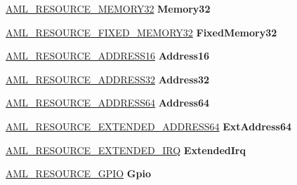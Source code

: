 \begin{DoxyCompactItemize}
\item 
\mbox{\label{unionaml__resource_a47e24e4893905f5f7604a7946262ae21}} 
\hyperlink{structaml__resource__memory32}{A\+M\+L\+\_\+\+R\+E\+S\+O\+U\+R\+C\+E\+\_\+\+M\+E\+M\+O\+R\+Y32} {\bfseries Memory32}
\item 
\mbox{\label{unionaml__resource_a48fd389a6eec34ed3a9aa0e838ae71a1}} 
\hyperlink{structaml__resource__fixed__memory32}{A\+M\+L\+\_\+\+R\+E\+S\+O\+U\+R\+C\+E\+\_\+\+F\+I\+X\+E\+D\+\_\+\+M\+E\+M\+O\+R\+Y32} {\bfseries Fixed\+Memory32}
\item 
\mbox{\label{unionaml__resource_aa1d1ab2c7bba1087ca0f10caaaa8696e}} 
\hyperlink{structaml__resource__address16}{A\+M\+L\+\_\+\+R\+E\+S\+O\+U\+R\+C\+E\+\_\+\+A\+D\+D\+R\+E\+S\+S16} {\bfseries Address16}
\item 
\mbox{\label{unionaml__resource_a4c855e45bf46669a1ba15382fc083dc1}} 
\hyperlink{structaml__resource__address32}{A\+M\+L\+\_\+\+R\+E\+S\+O\+U\+R\+C\+E\+\_\+\+A\+D\+D\+R\+E\+S\+S32} {\bfseries Address32}
\item 
\mbox{\label{unionaml__resource_af99ad0c278ee375ca3a6c171d34a7ec8}} 
\hyperlink{structaml__resource__address64}{A\+M\+L\+\_\+\+R\+E\+S\+O\+U\+R\+C\+E\+\_\+\+A\+D\+D\+R\+E\+S\+S64} {\bfseries Address64}
\item 
\mbox{\label{unionaml__resource_aec5c38d1662ab151cc7abc9b7e4dd73a}} 
\hyperlink{structaml__resource__extended__address64}{A\+M\+L\+\_\+\+R\+E\+S\+O\+U\+R\+C\+E\+\_\+\+E\+X\+T\+E\+N\+D\+E\+D\+\_\+\+A\+D\+D\+R\+E\+S\+S64} {\bfseries Ext\+Address64}
\item 
\mbox{\label{unionaml__resource_a30637365911d3a8edfb04c9284376152}} 
\hyperlink{structaml__resource__extended__irq}{A\+M\+L\+\_\+\+R\+E\+S\+O\+U\+R\+C\+E\+\_\+\+E\+X\+T\+E\+N\+D\+E\+D\+\_\+\+I\+RQ} {\bfseries Extended\+Irq}
\item 
\mbox{\label{unionaml__resource_ac07735b8663996fc8352a4923fa3f6d7}} 
\hyperlink{structaml__resource__gpio}{A\+M\+L\+\_\+\+R\+E\+S\+O\+U\+R\+C\+E\+\_\+\+G\+P\+IO} {\bfseries Gpio}
\item 

\end{DoxyCompactItemize}

